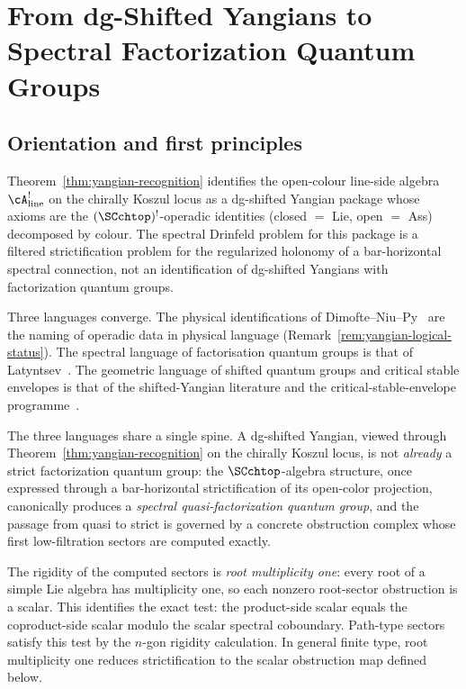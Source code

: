 \makeatletter
{}
\makeatother

\chapter{From dg-Shifted Yangians to Spectral Factorization Quantum Groups}
\label{chap:dg-shifted-factorization}

\section{Orientation and first principles}

Theorem~\ref{thm:yangian-recognition} identifies the open-colour
line-side algebra $\cA^!_{\mathrm{line}}$ on the chirally Koszul locus
as a dg-shifted Yangian package whose axioms are the
$(\SCchtop)^{!}$-operadic identities (closed $=$ Lie, open $=$ Ass)
decomposed by colour. The spectral Drinfeld problem for this package is
a filtered strictification problem for the regularized holonomy of a
bar-horizontal spectral connection, not an identification of dg-shifted
Yangians with factorization quantum groups.

Three languages converge. The physical identifications of
Dimofte--Niu--Py~\cite{DNP25} are the naming of operadic data in
physical language (Remark~\ref{rem:yangian-logical-status}). The
spectral language of factorisation quantum groups is that of
Latyntsev~\cite{Latyntsev23}. The geometric language of shifted quantum
groups and critical stable envelopes is that of the shifted-Yangian
literature and the critical-stable-envelope
programme~\cite{COZZ26}.

The three languages share a single spine. A dg-shifted Yangian, viewed
through Theorem~\ref{thm:yangian-recognition} on the chirally Koszul
locus, is not \emph{already} a strict factorization quantum group: the
$\SCchtop$-algebra structure, once expressed through a bar-horizontal
strictification of its open-color projection, canonically produces a
\emph{spectral quasi-factorization quantum group}, and the passage from
quasi to strict is governed by a concrete obstruction complex whose
first low-filtration sectors are computed exactly.

The rigidity of the computed sectors is \emph{root multiplicity one}:
every root of a simple Lie algebra has multiplicity one, so each
nonzero root-sector obstruction is a scalar. This identifies the
exact test: the product-side scalar equals the coproduct-side scalar
modulo the scalar spectral coboundary. Path-type sectors satisfy this
test by the $n$-gon rigidity calculation. In general finite type, root
multiplicity one reduces strictification to the scalar obstruction map
defined below.

